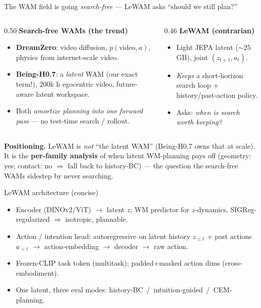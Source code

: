 \documentclass[aspectratio=169,9pt]{beamer}
\begin{document}
\begin{frame}{The WAM field is going \emph{search-free} --- LeWAM asks ``should we still plan?''}
\begin{columns}[T]
\begin{column}{0.50\textwidth}
\textbf{Search-free WAMs (the trend)}
\begin{itemize}\footnotesize
  \item \textbf{DreamZero}: video diffusion, $p(\text{video},a)$, physics from internet-scale video.
  \item \textbf{Being-H0.7}: a \emph{latent} WAM (our exact term!), 200k h egocentric video, future-aware latent workspace.
  \item Both \emph{amortize planning into one forward pass} --- no test-time search / rollout.
\end{itemize}
\end{column}
\begin{column}{0.46\textwidth}
\textbf{LeWAM (contrarian)}
\begin{itemize}\footnotesize
  \item Light JEPA latent ($\sim$$25$\,GB), joint $(z_{t+1},a_t)$.
  \item \emph{Keeps} a short-horizon search loop + history/past-action policy.
  \item Asks: \emph{when is search worth keeping?}
\end{itemize}
\end{column}
\end{columns}
\vspace{0.4em}
\textbf{Positioning.} LeWAM is \emph{not} ``the latent WAM'' (Being-H0.7 owns that at scale). It is the \textbf{per-family analysis} of when latent WM-planning pays off (geometry: yes; contact: no $\Rightarrow$ fall back to history-BC) --- the question the search-free WAMs sidestep by never searching.
\end{frame}

\begin{frame}{LeWAM architecture (concise)}
\begin{itemize}
  \item Encoder (DINOv2/ViT) $\to$ latent $z$; WM predictor for $z$-dynamics, SIGReg-regularized $\Rightarrow$ isotropic, plannable.
  \item Action / intention head: autoregressive on latent history $z_{\le t}$ + past actions $a_{<t}$ $\to$ action-embedding $\to$ decoder $\to$ raw action.
  \item Frozen-CLIP task token (multitask); padded+masked action dims (cross-embodiment).
  \item One latent, three eval modes: history-BC \,/\, intuition-guided \,/\, CEM-planning.
\end{itemize}
\end{frame}
\end{document}
